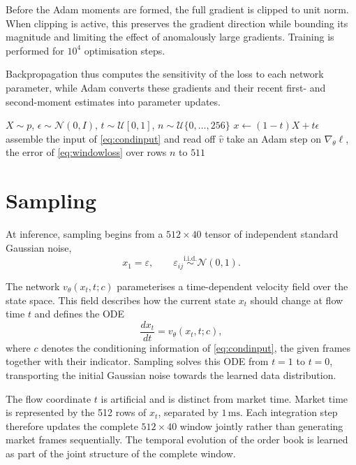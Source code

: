 \documentclass[10pt,a4paper]{article}
\begin{document}
Before the Adam moments are formed, the full gradient is clipped to unit norm.
When clipping is active, this preserves the gradient direction while bounding its
magnitude and limiting the effect of anomalously large gradients. Training is
performed for $10^4$ optimisation steps.

Backpropagation thus computes the sensitivity of the loss to each network
parameter, while Adam converts these gradients and their recent first- and
second-moment estimates into parameter updates.

\begin{algorithm}[H]
\caption{Pretraining}
\label{alg:pretrain}
\begin{algorithmic}[1]
\Repeat
  \State $X \sim p$, \; $\epsilon \sim \mathcal{N}(0,I)$, \;
         $t \sim \mathcal{U}[0,1]$, \; $n \sim \mathcal{U}\{0,\ldots,256\}$
  \State $x \gets (1-t)X + t\epsilon$
  \State assemble the input of \eqref{eq:condinput} and read off $\hat{v}$
  \State take an Adam step on $\nabla_\theta \ell$, the error of
         \eqref{eq:windowloss} over rows $n$ to $511$
\end{algorithmic}
\end{algorithm}

\section{Sampling}

At inference, sampling begins from a $512\times40$ tensor of independent
standard Gaussian noise,
\[
x_1=\varepsilon,
\qquad
\varepsilon_{ij}\overset{\mathrm{i.i.d.}}{\sim}\mathcal N(0,1).
\]

The network $v_\theta(x_t,t;c)$ parameterises a time-dependent velocity field
over the state space. This field describes how the current state $x_t$ should
change at flow time $t$ and defines the ODE
\[
\frac{dx_t}{dt}=v_\theta(x_t,t;c),
\]
where $c$ denotes the conditioning information of \eqref{eq:condinput}, the
given frames together with their indicator. Sampling solves this ODE from $t=1$
to $t=0$, transporting the initial Gaussian noise towards the learned data
distribution.

The flow coordinate $t$ is artificial and is distinct from market time. Market
time is represented by the 512 rows of $x_t$, separated by $1\,\mathrm{ms}$.
Each integration step therefore updates the complete $512\times40$ window
jointly rather than generating market frames sequentially. The temporal
evolution of the order book is learned as part of the joint structure of the
complete window.
\end{document}

